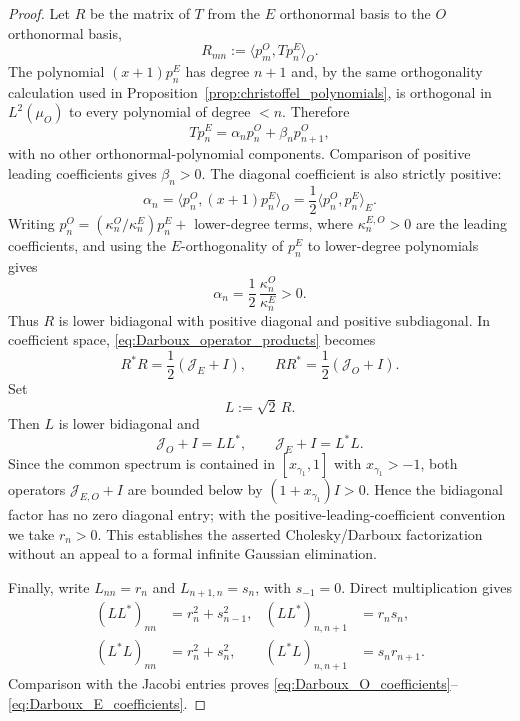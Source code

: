 \documentclass[preprint,12pt]{elsarticle}
\numberwithin{equation}{section}
\theoremstyle{plain}
\theoremstyle{definition}
\theoremstyle{remark}
\begin{document}
\begin{proof}
Let $R$ be the matrix of $T$ from the $E$ orthonormal basis to the $O$ orthonormal basis,
\begin{equation}
R_{mn}:=\langle p_m^O,Tp_n^E\rangle_O.
\end{equation}
The polynomial $(x+1)p_n^E$ has degree $n+1$ and, by the same orthogonality calculation used in Proposition~\ref{prop:christoffel_polynomials}, is orthogonal in $L^2(\mu_O)$ to every polynomial of degree $<n$.  Therefore
\begin{equation}
Tp_n^E=\alpha_n p_n^O+\beta_n p_{n+1}^O,
\end{equation}
with no other orthonormal-polynomial components.  Comparison of positive leading coefficients gives \(\beta_n>0\).  The diagonal coefficient is also strictly positive:
\[
\alpha_n
=\langle p_n^O,(x+1)p_n^E\rangle_O
=\frac12\langle p_n^O,p_n^E\rangle_E.
\]
Writing \(p_n^O=(\kappa_n^O/\kappa_n^E)p_n^E+\) lower-degree terms, where
\(\kappa_n^{E,O}>0\) are the leading coefficients, and using the \(E\)-orthogonality
of \(p_n^E\) to lower-degree polynomials gives
\[
\alpha_n=\frac12\,\frac{\kappa_n^O}{\kappa_n^E}>0.
\]
Thus \(R\) is lower bidiagonal with positive diagonal and positive subdiagonal.  In coefficient space, \eqref{eq:Darboux_operator_products} becomes
\begin{equation}
R^*R=\frac12(\mathcal J_E+I),
\qquad
RR^*=\frac12(\mathcal J_O+I).
\end{equation}
Set
\begin{equation}
L:=\sqrt2\,R.
\end{equation}
Then $L$ is lower bidiagonal and
\begin{equation}
\mathcal J_O+I=LL^*,
\qquad
\mathcal J_E+I=L^*L.
\end{equation}
Since the common spectrum is contained in $[x_{\gamma_1},1]$ with $x_{\gamma_1}>-1$, both operators $\mathcal J_{E,O}+I$ are bounded below by $(1+x_{\gamma_1})I>0$.  Hence the bidiagonal factor has no zero diagonal entry; with the positive-leading-coefficient convention we take $r_n>0$.  This establishes the asserted Cholesky/Darboux factorization without an appeal to a formal infinite Gaussian elimination.

Finally, write $L_{nn}=r_n$ and $L_{n+1,n}=s_n$, with $s_{-1}=0$.  Direct multiplication gives
\begin{align}
(LL^*)_{nn}&=r_n^2+s_{n-1}^2,
&(LL^*)_{n,n+1}&=r_ns_n,\\
(L^*L)_{nn}&=r_n^2+s_n^2,
&(L^*L)_{n,n+1}&=s_nr_{n+1}.
\end{align}
Comparison with the Jacobi entries proves \eqref{eq:Darboux_O_coefficients}--\eqref{eq:Darboux_E_coefficients}.
\end{proof}
\end{document}
